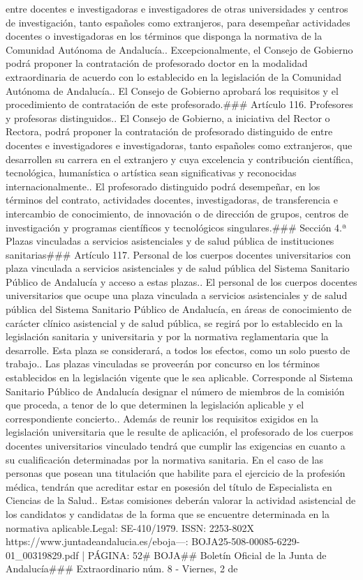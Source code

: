 \documentclass{article}
\begin{document}
\begin{itemize}
{{entre docentes e investigadoras e investigadores de otras universidades y centros de investigación, tanto españoles como extranjeros, para desempeñar actividades docentes o investigadoras en los términos que disponga la normativa de la Comunidad Autónoma de Andalucía.. Excepcionalmente, el Consejo de Gobierno podrá proponer la contratación de profesorado doctor en la modalidad extraordinaria de acuerdo con lo establecido en la legislación de la Comunidad Autónoma de Andalucía.. El Consejo de Gobierno aprobará los requisitos y el procedimiento de contratación de este profesorado.\n\n### Artículo 116. Profesores y profesoras distinguidos.. El Consejo de Gobierno, a iniciativa del Rector o Rectora, podrá proponer la contratación de profesorado distinguido de entre docentes e investigadores e investigadoras, tanto españoles como extranjeros, que desarrollen su carrera en el extranjero y cuya excelencia y contribución científica, tecnológica, humanística o artística sean significativas y reconocidas internacionalmente.. El profesorado distinguido podrá desempeñar, en los términos del contrato, actividades docentes, investigadoras, de transferencia e intercambio de conocimiento, de innovación o de dirección de grupos, centros de investigación y programas científicos y tecnológicos singulares.\n\n### Sección 4.ª Plazas vinculadas a servicios asistenciales y de salud pública de instituciones sanitarias\n\n### Artículo 117. Personal de los cuerpos docentes universitarios con plaza vinculada a servicios asistenciales y de salud pública del Sistema Sanitario Público de Andalucía y acceso a estas plazas.. El personal de los cuerpos docentes universitarios que ocupe una plaza vinculada a servicios asistenciales y de salud pública del Sistema Sanitario Público de Andalucía, en áreas de conocimiento de carácter clínico asistencial y de salud pública, se regirá por lo establecido en la legislación sanitaria y universitaria y por la normativa reglamentaria que la desarrolle. Esta plaza se considerará, a todos los efectos, como un solo puesto de trabajo.. Las plazas vinculadas se proveerán por concurso en los términos establecidos en la legislación vigente que le sea aplicable. Corresponde al Sistema Sanitario Público de Andalucía designar el número de miembros de la comisión que proceda, a tenor de lo que determinen la legislación aplicable y el correspondiente concierto.. Además de reunir los requisitos exigidos en la legislación universitaria que le resulte de aplicación, el profesorado de los cuerpos docentes universitarios vinculado tendrá que cumplir las exigencias en cuanto a su cualificación determinadas por la normativa sanitaria. En el caso de las personas que posean una titulación que habilite para el ejercicio de la profesión médica, tendrán que acreditar estar en posesión del título de Especialista en Ciencias de la Salud.. Estas comisiones deberán valorar la actividad asistencial de los candidatos y candidatas de la forma que se encuentre determinada en la normativa aplicable.\n{} Legal: SE-410/1979. ISSN: 2253-802X https://www.juntadeandalucia.es/eboja\n{}\n\n---\n\nFUENTE: BOJA25-508-00085-6229-01_00319829.pdf | PÁGINA: 52\n# BOJA\n## Boletín Oficial de la Junta de Andalucía\n### Extraordinario núm. 8 - Viernes, 2 de }}
\end{itemize}
\end{document}
